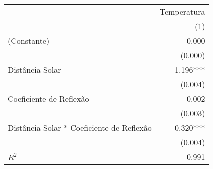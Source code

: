 \begin{tabular}{lr}
\toprule
                                          & \multicolumn{1}{c}{Temperatura} \\ 
\cmidrule(lr){2-2} 
                                          &                             (1) \\ 
\midrule
(Constante)                               &                           0.000 \\ 
                                          &                         (0.000) \\ 
Distância Solar                           &                       -1.196*** \\ 
                                          &                         (0.004) \\ 
Coeficiente de Reflexão                   &                           0.002 \\ 
                                          &                         (0.003) \\ 
Distância Solar * Coeficiente de Reflexão &                        0.320*** \\ 
                                          &                         (0.004) \\ 
\midrule
$R^2$                                     &                           0.991 \\ 
\bottomrule
\end{tabular}
